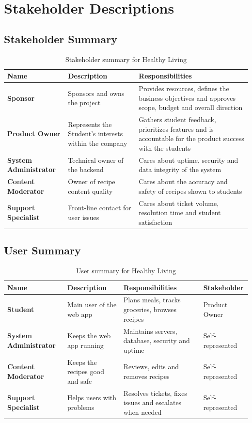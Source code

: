 \documentclass[10pt,letterpaper]{article}
\begin{document}
\section{Stakeholder Descriptions}

\subsection{Stakeholder Summary}

\begin{table}[h!]
\centering
\caption{Stakeholder summary for Healthy Living}
\label{tab:stakeholder-summary}
\begin{tabularx}{\textwidth}{|>{\bfseries}p{}|X|X|}
\hline
Name & Description & Responsibilities \\
\hline
Sponsor & Sponsors and owns the project & Provides resources, defines the business objectives and approves scope, budget and overall direction \\
\hline
Product Owner & Represents the Student's interests within the company & Gathers student feedback, prioritizes features and is accountable for the product success with the students \\
\hline
System Administrator & Technical owner of the backend & Cares about uptime, security and data integrity of the system \\
\hline
Content Moderator & Owner of recipe content quality & Cares about the accuracy and safety of recipes shown to students \\
\hline
Support Specialist & Front-line contact for user issues & Cares about ticket volume, resolution time and student satisfaction \\
\hline
\end{tabularx}
\end{table}

\subsection{User Summary}

\begin{table}[h!]
\centering
\caption{User summary for Healthy Living}
\label{tab:user-summary}
\begin{tabularx}{\textwidth}{|>{\bfseries}p{}|X|X|X|}
\hline
Name & Description & Responsibilities & Stakeholder \\
\hline
Student & Main user of the web app & Plans meals, tracks groceries, browses recipes & Product Owner \\
\hline
System Administrator & Keeps the web app running & Maintains servers, database, security and uptime & Self-represented \\
\hline
Content Moderator & Keeps the recipes good and safe & Reviews, edits and removes recipes & Self-represented \\
\hline
Support Specialist & Helps users with problems & Resolves tickets, fixes issues and escalates when needed & Self-represented \\
\hline
\end{tabularx}
\end{table}
\end{document}
